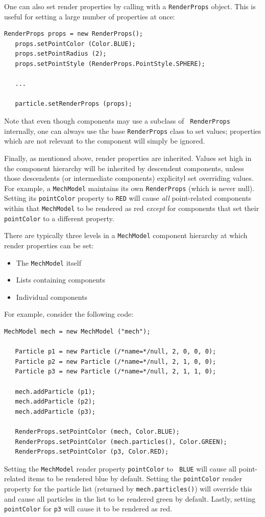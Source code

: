 One can also set render properties by calling
 with a
{\tt RenderProps} object. This is useful for setting a large number of
properties  at once:
%
\begin{lstlisting}[]
   RenderProps props = new RenderProps();
   props.setPointColor (Color.BLUE);
   props.setPointRadius (2);
   props.setPointStyle (RenderProps.PointStyle.SPHERE);

   ...

   particle.setRenderProps (props);
\end{lstlisting}
Note that even though components may use a subclass of {\tt
RenderProps} internally, one can always use the base {\tt RenderProps}
class to set values; properties which are not relevant to the
component will simply be ignored.

Finally, as mentioned above, render properties are inherited.  Values
set high in the component hierarchy will be inherited by descendent
components, unless those descendents (or intermediate components)
explicityl set overriding values.  For example, a {\tt MechModel}
maintains its own {\tt RenderProps} (which is never null). Setting its
{\tt pointColor} property to {\tt RED} will cause {\it all}
point-related components within that {\tt MechModel} to be rendered as
red {\it except} for components that set their {\tt pointColor} to a
different property. 

There are typically three levels in a {\tt MechModel} component
hierarchy at which render properties can be set:

\begin{itemize}

\item The {\tt MechModel} itself

\item Lists containing components

\item Individual components

\end{itemize}

For example, consider the following code:
%
\begin{lstlisting}[]
   MechModel mech = new MechModel ("mech");

   Particle p1 = new Particle (/*name=*/null, 2, 0, 0, 0);
   Particle p2 = new Particle (/*name=*/null, 2, 1, 0, 0);
   Particle p3 = new Particle (/*name=*/null, 2, 1, 1, 0);

   mech.addParticle (p1);
   mech.addParticle (p2);
   mech.addParticle (p3);

   RenderProps.setPointColor (mech, Color.BLUE);
   RenderProps.setPointColor (mech.particles(), Color.GREEN);
   RenderProps.setPointColor (p3, Color.RED);   
\end{lstlisting}
%
Setting the {\tt MechModel} render property {\tt pointColor} to {\tt
BLUE} will cause all point-related items to be rendered blue by
default. Setting the {\tt pointColor} render property for the particle
list (returned by {\tt mech.particles()}) will override this and cause
all particles in the list to be rendered green by default. Lastly,
setting {\tt pointColor} for {\tt p3} will cause it to be rendered as
red.

